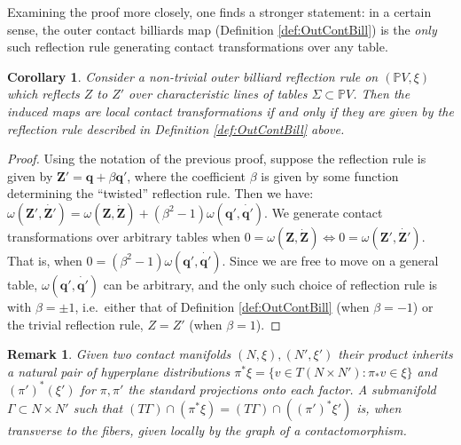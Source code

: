 \documentclass{article}
\newtheorem{corr}{Corollary}[section]
\newtheorem{rmk}{Remark}
\begin{document}
Examining the proof more closely, one finds a stronger statement: in a certain sense, the 
outer contact billiards map (Definition \ref{def:OutContBill}) is the {\em only} such 
reflection rule generating contact transformations over any table.
\begin{corr}\label{corr:Uniqueness}
    Consider a non-trivial outer billiard reflection rule on $(\mathbb{P}V,\xi)$ which 
    reflects $Z$ to $Z'$ over characteristic lines of tables $\Sigma\subset\mathbb{P}V$. 
    Then the induced maps are local contact transformations if and only if they are given by 
    the reflection rule described in Definition \ref{def:OutContBill} above.
\end{corr}
\begin{proof}
    Using the notation of the previous proof, suppose the reflection rule is given by 
    $\boldsymbol{Z'} = \boldsymbol{q} + \beta \boldsymbol{q'}$, where the coefficient 
    $\beta$ is given by some function determining the ``twisted'' reflection rule. Then we 
    have: $\omega(\boldsymbol{Z'}, \boldsymbol{\dot{Z'}}) = \omega(\boldsymbol{Z}, 
    \boldsymbol{\dot{Z}}) + (\beta^2 - 1)\omega(\boldsymbol{q'}, \boldsymbol{\dot{q'}})$. 
    We generate contact transformations over arbitrary tables when 
    $0 = \omega(\boldsymbol{Z}, \boldsymbol{\dot{Z}}) \iff 0 = \omega(\boldsymbol{Z'}, \boldsymbol{\dot{Z'}})$. That is, when $0 = (\beta^2 - 1)\omega(\boldsymbol{q'}, \boldsymbol{\dot{q'}})$. Since we are free to move on a general table, 
    $\omega(\boldsymbol{q'}, \boldsymbol{\dot{q'}})$ can be arbitrary, and the only such 
    choice of reflection rule is with $\beta = \pm 1$, i.e.~either that of
    Definition \ref{def:OutContBill} (when $\beta = -1$) or the trivial reflection rule, 
    $Z = Z'$ (when $\beta = 1$).
\end{proof}

\begin{rmk}\label{rmk:ContGraph}
    Given two contact manifolds $(N,\xi), (N',\xi')$ their product inherits a natural pair of hyperplane distributions $\pi^*\xi = \{ v\in T(N\times N') : \pi_*v \in \xi\}$ and $(\pi')^*(\xi')$ for $\pi, \pi'$ the standard projections onto each factor. A submanifold $\Gamma\subset N\times N'$ such that $(T\Gamma)\cap (\pi^*\xi) = (T\Gamma)\cap ((\pi')^*\xi')$ is, when transverse to the fibers, given locally by the graph of a contactomorphism.  %
\end{rmk}

\end{document}
